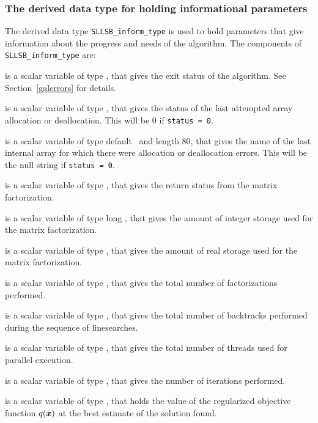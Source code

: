 \documentclass{galahad}
\newcommand{\packagename}{SLLSB}
\begin{document}

\subsubsection{The derived data type for holding informational
 parameters}\label{typeinform}
The derived data type
{\tt \packagename\_inform\_type}
is used to hold parameters that give information about the progress and needs
of the algorithm. The components of
{\tt \packagename\_inform\_type}
are:

\begin{description}

 is a scalar variable of type \integer, that gives the
exit status of the algorithm.
See Section~\ref{galerrors}
for details.

 is a scalar variable of type \integer, that gives
the status of the last attempted array allocation or deallocation.
This will be 0 if {\tt status = 0}.

 is a scalar variable of type default \character\
and length 80, that  gives the name of the last internal array
for which there were allocation or deallocation errors.
This will be the null string if {\tt status = 0}.

 is a scalar variable of type \integer, that
gives the return status from the matrix factorization.

 is a scalar variable of type long
\integer, that gives the amount of integer storage used for the matrix
factorization.

 is a scalar variable of type \longinteger,
that gives the amount of real storage used for the matrix factorization.

 is a scalar variable of type \integer, that gives the
total number of factorizations performed.

 is a scalar variable of type \integer, that gives the
total number of backtracks performed during the sequence of linesearches.

 is a scalar variable of type \integer, that gives the
total number of threads used for parallel execution.

 is a scalar variable of type \integer, that
gives the number of iterations performed.

 is a scalar variable of type \realdp, that holds the
value of the regularized objective function  $q({\bm{x}})$ at the 
best estimate of the solution found.


\end{description}
\end{document}

